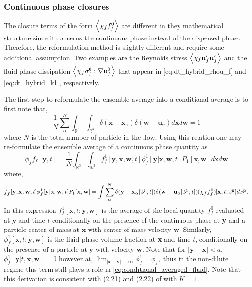 \subsubsection{Continuous phase closures}

The closure terms of the form $\left<\chi_f f_f^0\right>$ are different in they mathematical structure since it concerns the continuous phase instead of the dispersed phase. 
Therefore, the reformulation method is slightly different and require some additional assumption. 
Two examples are the Reynolds stress $\left<\chi_f \textbf{u}_f'\textbf{u}_f'\right>$ and the fluid phase dissipation $\left<\chi_f\sigma_f^0:\mathbf{\nabla} \textbf{u}_f^0\right>$ that appear in \ref{eq:dt_hybrid_rhou_f} and \ref{eq:dt_hybrid_k1}, respectively.  

The first step to reformulate the ensemble average into a conditional average is to first note that, 
\begin{equation}
    \frac{1}{N}\sum_\alpha^N
    \int_{\mathbb{R}^3}
    \int_{\mathbb{R}^3}
    \delta(\textbf{x}-\textbf{x}_\alpha)
    \delta(\textbf{w}-\textbf{u}_\alpha)
    d\textbf{x}
    d\textbf{w}
    = 1
\end{equation}
where $N$ is the total number of particle in the flow. 
Using this relation one may re-formulate the ensemble average of a continuous phase quantity as 
\begin{equation}
    \phi_f f_f[\textbf{y},t]
    = 
    \frac{1}{N}
    \int_{\mathbb{R}^3}
    \int_{\mathbb{R}^3}
    f_f^1[\textbf{y},\textbf{x},\textbf{w},t] \phi_f^1[\textbf{y}|\textbf{x},\textbf{w},t]  P_1[\textbf{x},\textbf{w}] 
    d\textbf{x} 
    d\textbf{w}
    \label{eq:conditional_averaged_fluid}
\end{equation}
where,
\begin{equation*}
    f_f^1[\textbf{y},\textbf{x},\textbf{w},t] \phi_f^1[\textbf{y}|\textbf{x},\textbf{w},t]  P_1[\textbf{x},\textbf{w}]
    =     
    \int
    \sum_\alpha^N 
    \delta(\textbf{y}-\textbf{x}_\alpha[\mathscr{F},t])
     \delta(\textbf{w}-\textbf{u}_\alpha[\mathscr{F},t])
    (\chi_f
    f^0_f)[\textbf{x},t;\mathscr{F}]
    d\mathscr{P}.
\end{equation*}
In this expression $f_f^1[\textbf{x},t;\textbf{y},\textbf{w}]$ is the average of the local quantity $f_f^0$ evaluated at $\textbf{y}$ and time $t$ conditionally on the presence of the continuous phase at \textbf{y} and a particle center of mass at $\textbf{x}$ with center of mass velocity $\textbf{w}$. 
Similarly, $\phi_f^1[\textbf{x},t;\textbf{y},\textbf{w}]$ is the fluid phase volume fraction at \textbf{x} and time $t$, conditionally on the presence of a particle at $\textbf{y}$ with velocity \textbf{w}. 
Note that for $|\textbf{y}- \textbf{x}| < a$, $\phi_f^1[\textbf{y}|t,\textbf{x},\textbf{w}] = 0$ however at, 
$
    \lim_{|\textbf{x} - \textbf{y}| \to \infty} \phi_f^1 = \phi_f,
$
thus in the non-dilute regime this term still plays a role in \ref{eq:conditional_averaged_fluid}. 
Note that this derivation is consistent with (2.21) and (2.22) of \citet{zhang1994ensemble} with $K = 1$. 

